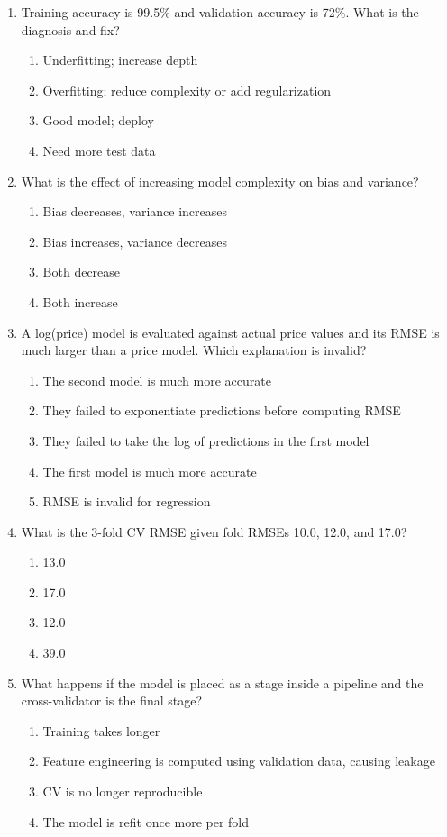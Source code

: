 \documentclass[11pt]{article}
\begin{document}
\begin{enumerate}[leftmargin=*, label=\textbf{Q\arabic*.}, start=58]
		\item Training accuracy is 99.5\% and validation accuracy is 72\%. What is the diagnosis and fix?
		\begin{enumerate}[label=(\alph*)]
			\item Underfitting; increase depth
			\item Overfitting; reduce complexity or add regularization
			\item Good model; deploy
			\item Need more test data
		\end{enumerate}
		
		\item What is the effect of increasing model complexity on bias and variance?
		\begin{enumerate}[label=(\alph*)]
			\item Bias decreases, variance increases
			\item Bias increases, variance decreases
			\item Both decrease
			\item Both increase
		\end{enumerate}
		
		\item A log(price) model is evaluated against actual price values and its RMSE is much larger than a price model. Which explanation is invalid?
		\begin{enumerate}[label=(\alph*)]
			\item The second model is much more accurate
			\item They failed to exponentiate predictions before computing RMSE
			\item They failed to take the log of predictions in the first model
			\item The first model is much more accurate
			\item RMSE is invalid for regression
		\end{enumerate}
		
		\item What is the 3-fold CV RMSE given fold RMSEs 10.0, 12.0, and 17.0?
		\begin{enumerate}[label=(\alph*)]
			\item 13.0
			\item 17.0
			\item 12.0
			\item 39.0
		\end{enumerate}
		
		\item What happens if the model is placed as a stage inside a pipeline and the cross-validator is the final stage?
		\begin{enumerate}[label=(\alph*)]
			\item Training takes longer
			\item Feature engineering is computed using validation data, causing leakage
			\item CV is no longer reproducible
			\item The model is refit once more per fold
		\end{enumerate}
		

\end{enumerate}
\end{document}
